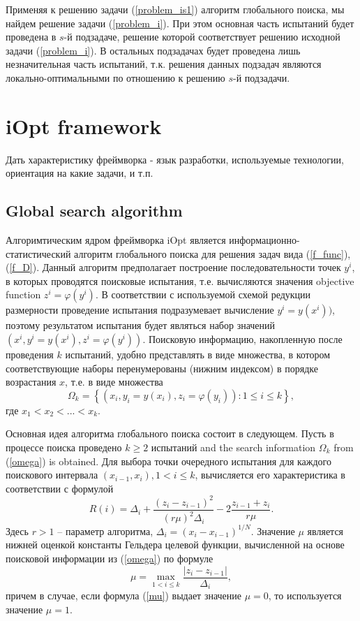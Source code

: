 \documentclass[preprint,12pt]{elsarticle}
\begin{document}
Применяя к решению задачи (\ref{problem_is1}) алгоритм глобального поиска, мы найдем решение задачи (\ref{problem_i}). При этом основная часть испытаний будет проведена в $s$-й подзадаче, решение которой соответствует решению исходной задачи (\ref{problem_i}). В остальных подзадачах будет проведена лишь незначительная часть испытаний, т.к. решения данных подзадач являются локально-оптимальными по отношению к решению $s$-й подзадачи.

\section{iOpt framework} 
\label{sec_iOpt}

Дать характеристику фреймворка - язык разработки, используемые технологии, ориентация на какие задачи, и т.п. 


\subsection{Global search algorithm}
\label{sec_GSA}

Алгоримтическим ядром фреймворка iOpt является информационно-статистический алгоритм глобального поиска для решения задач вида (\ref{f_func}), (\ref{f_D}). 
Данный алгоритм предполагает построение последовательности точек $y^i$, в которых проводятся поисковые испытания, т.е. вычисляются значения objective function $z^i = \varphi(y^i)$. В соответствии с используемой схемой редукции размерности проведение испытания подразумевает вычисление $y^i=y(x^i))$, поэтому результатом испытания будет являться набор значений $(x^i, y^i=y(x^i), z^i = \varphi(y^i))$. 
Поисковую информацию, накопленную после проведения $k$ испытаний, удобно представлять в виде множества, в котором соответствующие наборы перенумерованы (нижним индексом) в порядке возрастания $x$, т.е. в виде множества 
\begin{equation}\label{omega}
\Omega_k = \left\{  (x_i, y_i=y(x_i), z_i = \varphi(y_i)): 1 \leq i \leq k  \right\},	
\end{equation}
где $x_1 < x_2 < ... < x_k$.



Основная идея алгоритма глобального поиска состоит в следующем.
Пусть в процессе поиска проведено $k \geq 2$ испытаний and the search information $\Omega_k$ from (\ref{omega}) is obtained.
Для выбора точки очередного испытания для каждого поискового интервала $(x_{i-1},x_i), 1<i\leq k$, вычисляется его характеристика в соответствии с формулой
\begin{equation}\label{R}
R(i) = \Delta_i + \frac{(z_i-z_{i-1})^2}{(r\mu)^2\Delta_i}-2\frac{z_{i-1}+z_i}{r\mu}.	
\end{equation}
Здесь $r>1$ -- параметр алгоритма, $\Delta_i=(x_i-x_{i-1})^{1/N}$. Значение $\mu$ является нижней оценкой константы Гельдера целевой функции, вычисленной на основе поисковой информации из (\ref{omega}) по формуле
\begin{equation}\label{mu}
\mu = \max_{1<i\leq k}\frac{\left|z_i-z_{i-1}\right|}{\Delta_i},
\end{equation}
причем в случае, если формула (\ref{mu}) выдает значение $\mu=0$, то используется значение $\mu=1$.
\end{document}
